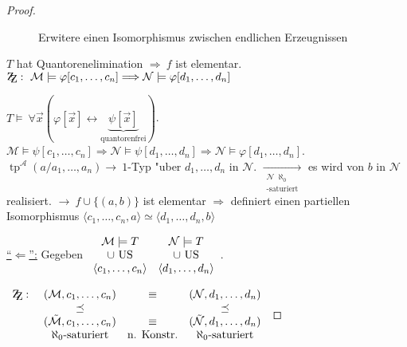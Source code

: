 \documentclass[a4paper,12pt,numbers=noenddot,parskip=full]{scrartcl}
\newcommand{\Forall}{~\forall}
\newcommand{\scrA}{\mathcal{A}}
\newcommand{\scrM}{\mathcal{M}}
\newcommand{\scrN}{\mathcal{N}}
\newcommand{\zz}{\mathrm{Z\kern-.3em\raise-0.5ex\hbox{Z}}:~}
\DeclareMathOperator{\typ}{tp}
\theoremstyle{dotless}
\begin{document}
\begin{proof}
\begin{figure}
\begin{tikzpicture}[x=0.75pt,y=0.75pt,yscale=-1,xscale=1]
	
	\end{tikzpicture}
	\caption{Erwitere einen Isomorphismus zwischen endlichen Erzeugnissen}
	\label{im:kartoffel:2}
	\end{figure}
	
	$T$ hat Quantorenelimination $\Longrightarrow~f$ ist elementar.\\
	$\zz \scrM \models \varphi[c_1, \dots, c_n] \Longrightarrow \scrN \models \varphi[d_1, \dots, d_n]$
	
	$T\models \Forall \vec{x} (\varphi[\vec{x}] \leftrightarrow \underbrace{\psi[\vec{x}]}_\text{quantorenfrei})$. $\scrM \models \psi[c_1, \dots, c_n] \Rightarrow \scrN \models \psi[d_1, \dots, d_n] \Rightarrow \scrN \models \varphi[d_1, \dots, d_n]$.\\
	$\typ^\scrA(a/a_1, \dots, a_n) \longrightarrow~ 1$-Typ "uber $d_1, \dots, d_n$ in $\scrN$. $\underset{\substack{\scrN~\aleph_0\\\text{-saturiert}}}{\longrightarrow}$ es wird von $b$ in $\scrN$ realisiert. $\longrightarrow~ f \cup \{(a,b)\}$ ist elementar $\Rightarrow$ definiert einen partiellen Isomorphismus $\langle c_1, \dots, c_n,a \rangle \simeq \langle d_1, \dots, d_n ,b \rangle$
	
	\underline{"`$\Leftarrow$"':} Gegeben $\begin{array}{c c}
		\scrM \models T &\scrN \models T\\
		\cup ~\text{US} &\cup ~\text{US}\\
		\langle c_{1} ,\dots ,c_{n} \rangle &\langle d_{1} ,\dots ,d_{n} \rangle
	\end{array}$. 
	
	$\begin{array}{c c c c}
		\zz &(\scrM, c_1, \dots, c_n)&\equiv &(\scrN, d_1, \dots, d_n)\\
		\phantom{x}&\preceq &\phantom{x} &\preceq\\
		\phantom{x}&(\tilde{\scrM}, c_1, \dots, c_n) &\equiv &(\tilde{\scrN}, d_1, \dots, d_n)\\
		\phantom{x}&\aleph_0 \text{-saturiert} &\text{n. Konstr.} &\aleph_0 \text{-saturiert}
	\end{array}$
	
\end{proof}
\end{document}
